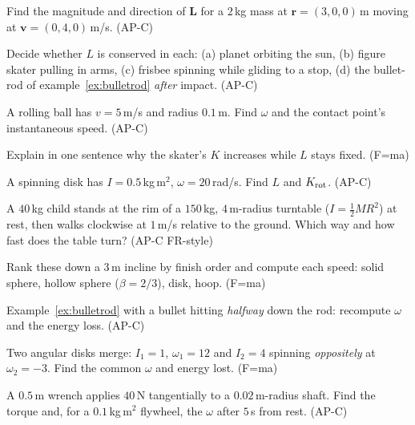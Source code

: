 \begin{exercise}[easy]
Find the magnitude and direction of $\mathbf L$ for a $2$\,kg mass at
$\mathbf r=(3,0,0)$\,m moving at $\mathbf v=(0,4,0)$\,m/s. (AP-C)
\end{exercise}
\begin{exercise}[easy]
Decide whether $L$ is conserved in each: (a) planet orbiting the sun,
(b) figure skater pulling in arms, (c) frisbee spinning while gliding to
a stop, (d) the bullet-rod of example~\ref{ex:bulletrod} \emph{after}
impact. (AP-C)
\end{exercise}
\begin{exercise}[easy]
A rolling ball has $v=5$\,m/s and radius $0.1$\,m. Find $\omega$ and
the contact point's instantaneous speed. (AP-C)
\end{exercise}
\begin{exercise}[easy]
Explain in one sentence why the skater's $K$ increases while $L$ stays
fixed. (F=ma)
\end{exercise}
\begin{exercise}[easy]
A spinning disk has $I=0.5$\,kg\,m$^{2}$, $\omega=20$\,rad/s. Find $L$
and $K_{\rm rot}$. (AP-C)
\end{exercise}
\begin{exercise}[medium]
A $40$\,kg child stands at the rim of a $150$\,kg, $4$\,m-radius
turntable ($I=\tfrac12MR^{2}$) at rest, then walks clockwise at
$1$\,m/s relative to the ground. Which way and how fast does the table
turn? (AP-C FR-style)
\end{exercise}
\begin{exercise}[medium]
Rank these down a $3$\,m incline by finish order and compute each speed:
solid sphere, hollow sphere ($\beta=2/3$), disk, hoop. (F=ma)
\end{exercise}
\begin{exercise}[medium]
Example~\ref{ex:bulletrod} with a bullet hitting \emph{halfway} down the
rod: recompute $\omega$ and the energy loss. (AP-C)
\end{exercise}
\begin{exercise}[medium]
Two angular disks merge: $I_1=1$, $\omega_1=12$ and $I_2=4$ spinning
\emph{oppositely} at $\omega_2=-3$. Find the common $\omega$ and energy
lost. (F=ma)
\end{exercise}
\begin{exercise}[medium]
A $0.5$\,m wrench applies $40$\,N tangentially to a $0.02$\,m-radius
shaft. Find the torque and, for a $0.1$\,kg\,m$^{2}$ flywheel, the
$\omega$ after $5$\,s from rest. (AP-C)
\end{exercise}
